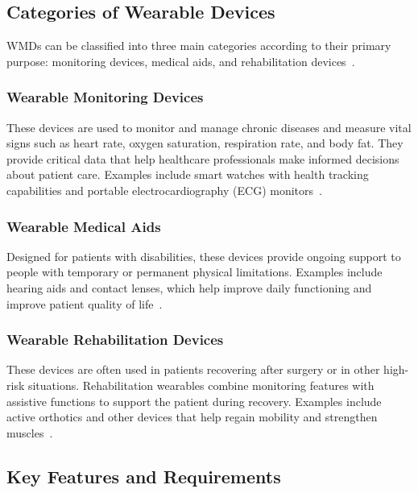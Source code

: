 \documentclass[journal]{IEEEtran}
\begin{document}
    \subsection{Categories of Wearable Devices}
    
    WMDs can be classified into three main categories according to their primary purpose: monitoring devices, medical aids, and rehabilitation devices~\cite{Fotiadis2006}.
    
        \subsubsection{Wearable Monitoring Devices}
        
        These devices are used to monitor and manage chronic diseases and measure vital signs such as heart rate, oxygen saturation, respiration rate, and body fat. They provide critical data that help healthcare professionals make informed decisions about patient care. Examples include smart watches with health tracking capabilities and portable electrocardiography (ECG) monitors~\cite{Fotiadis2006}.

        \subsubsection{Wearable Medical Aids}
        
        Designed for patients with disabilities, these devices provide ongoing support to people with temporary or permanent physical limitations. Examples include hearing aids and contact lenses, which help improve daily functioning and improve patient quality of life~\cite{Hemapriya2017}.

        \subsubsection{Wearable Rehabilitation Devices}
        
        These devices are often used in patients recovering after surgery or in other high-risk situations. Rehabilitation wearables combine monitoring features with assistive functions to support the patient during recovery. Examples include active orthotics and other devices that help regain mobility and strengthen muscles~\cite{Hemapriya2017}.

    \subsection{Key Features and Requirements}
    
\end{document}
